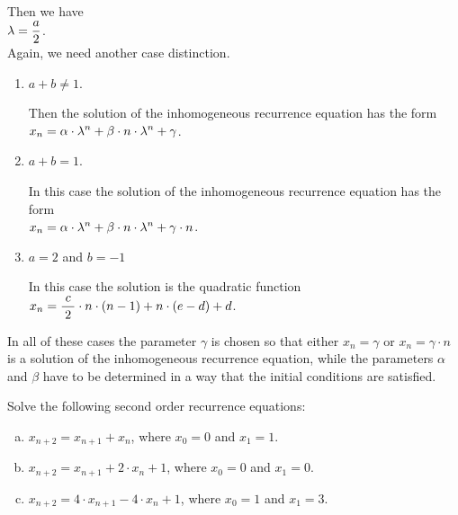 \begin{enumerate}
      Then we have 
      \\[0.2cm]
      \hspace*{1.3cm}
      $\displaystyle \lambda = \frac{a}{2}$.
      \\[0.2cm]
      Again, we need another case distinction.
      \begin{enumerate}
      \item $a + b \not= 1$.

            Then the solution of the inhomogeneous recurrence equation has the form
            \\[0.2cm]
            \hspace*{1.3cm}
            $\displaystyle x_{n} = \alpha \cdot \lambda^n + \beta \cdot n \cdot \lambda^n + \gamma$.
      \item $a + b = 1$.

            In this case the solution of the inhomogeneous recurrence equation has the form
            \\[0.2cm]
            \hspace*{1.3cm}
            $\displaystyle x_{n} = \alpha \cdot \lambda^n + \beta \cdot n \cdot \lambda^n + \gamma \cdot n$.
      \item $a = 2$ and $b = -1$

            In this case the solution is the quadratic function
            \\[0.2cm]
            \hspace*{1.3cm}
            $x_n = \displaystyle \frac{\;c\;}{2} \cdot n \cdot (n-1) + n \cdot (e - d) + d$.
      \end{enumerate}
\end{enumerate}
In all of these cases the parameter $\gamma$ is chosen so that either $x_n = \gamma$ or $x_n = \gamma \cdot n$
is a solution of the inhomogeneous recurrence equation, while the 
parameters $\alpha$ and $\beta$ have to be determined in a way that the initial conditions
are satisfied.

\exercise
Solve the following second order recurrence equations:
\begin{enumerate}[(a)]
\item $x_{n+2} = x_{n+1} + x_n$, \quad where $x_0 = 0$ and $x_1 = 1$.  
\item $x_{n+2} = x_{n+1} + 2 \cdot x_n + 1$, \quad where $x_0 = 0$ and $x_1 = 0$.  
\item $x_{n+2} = 4 \cdot x_{n+1} - 4 \cdot x_n + 1$, \quad where $x_0 = 1$ and $x_1 = 3$.  \eox
\end{enumerate}


